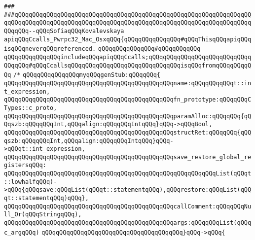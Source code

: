 \verb|###|\newline
\verb|###qQQqqQQqqQQqqQQqqQQqqQQqqQQqqQQqqQQqqQQqqQQqqQQqqQQqqQQqqQQqqQQqqQQqqQQqqQQqqQQqqQQqqQQqqQQqqQQqqQQqqQQqqQQqqQQqqQQqqQQqqQQqqQQqqQQqqQQqqQQqqQQq--qQQqSofiaqQQqKovalevskaya|\newline
\newline
\newline
\newline
\verb|apiqQQqCcalls_Pwrpc32_Mac_OsxqQQq{qQQqqQQqqQQqqQQq#qQQqThisqQQqapiqQQqisqQQqneverqQQqreferenced.|\newline
\verb|qQQqqQQqqQQqqQQq#qQQqqQQqqQQq|\newline
\verb|qQQqqQQqqQQqqQQqincludeqQQqapiqQQqCcalls;qQQqqQQqqQQqqQQqqQQqqQQqqQQqqQQqqQQq#qQQqCcallsqQQqqQQqqQQqqQQqqQQqqQQqqQQqqQQqisqQQqfromqQQqqQQqqQQq|\newline
\newline
\verb|/*|\newline
\verb|qQQqqQQqqQQqqQQqmyqQQqgenStub:qQQqqQQq{|\newline
\verb|qQQqqQQqqQQqqQQqqQQqqQQqqQQqqQQqqQQqqQQqqQQqqQQqname:qQQqqQQqqQQqt::int_expression,|\newline
\verb|qQQqqQQqqQQqqQQqqQQqqQQqqQQqqQQqqQQqqQQqqQQqqQQqfn_prototype:qQQqqQQqCTypes::c_proto,|\newline
\verb|qQQqqQQqqQQqqQQqqQQqqQQqqQQqqQQqqQQqqQQqqQQqqQQqparamAlloc:qQQqqQQq{qQQqszb:qQQqqQQqInt,qQQqalign:qQQqqQQqIntqQQq}qQQq->qQQqBool,|\newline
\verb|qQQqqQQqqQQqqQQqqQQqqQQqqQQqqQQqqQQqqQQqqQQqqQQqstructRet:qQQqqQQq{qQQqszb:qQQqqQQqInt,qQQqalign:qQQqqQQqIntqQQq}qQQq->qQQqt::int_expression,|\newline
\verb|qQQqqQQqqQQqqQQqqQQqqQQqqQQqqQQqqQQqqQQqqQQqqQQqsave_restore_global_registersqQQq:|\newline
\verb|qQQqqQQqqQQqqQQqqQQqqQQqqQQqqQQqqQQqqQQqqQQqqQQqqQQqqQQqqQQqList(qQQqt::lowhalfqQQq)->qQQq{qQQqsave:qQQqList(qQQqt::statementqQQq),qQQqrestore:qQQqList(qQQqt::statementqQQq)qQQq},|\newline
\verb|qQQqqQQqqQQqqQQqqQQqqQQqqQQqqQQqqQQqqQQqqQQqqQQqcallComment:qQQqqQQqNull_Or(qQQqStringqQQq),|\newline
\verb|qQQqqQQqqQQqqQQqqQQqqQQqqQQqqQQqqQQqqQQqqQQqqQQqargs:qQQqqQQqList(qQQqc_argqQQq)|\newline
\verb|qQQqqQQqqQQqqQQqqQQqqQQqqQQqqQQqqQQqqQQq}qQQq->qQQq{|\newline
